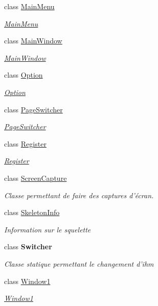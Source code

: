 \begin{DoxyCompactItemize}
class \hyperlink{class_w_p_f_page_switch_1_1_main_menu}{Main\+Menu}
\begin{DoxyCompactList}\small\item\em \hyperlink{class_w_p_f_page_switch_1_1_main_menu}{Main\+Menu} \end{DoxyCompactList}\item 
class \hyperlink{class_w_p_f_page_switch_1_1_main_window}{Main\+Window}
\begin{DoxyCompactList}\small\item\em \hyperlink{class_w_p_f_page_switch_1_1_main_window}{Main\+Window} \end{DoxyCompactList}\item 
class \hyperlink{class_w_p_f_page_switch_1_1_option}{Option}
\begin{DoxyCompactList}\small\item\em \hyperlink{class_w_p_f_page_switch_1_1_option}{Option} \end{DoxyCompactList}\item 
class \hyperlink{class_w_p_f_page_switch_1_1_page_switcher}{Page\+Switcher}
\begin{DoxyCompactList}\small\item\em \hyperlink{class_w_p_f_page_switch_1_1_page_switcher}{Page\+Switcher} \end{DoxyCompactList}\item 
class \hyperlink{class_w_p_f_page_switch_1_1_register}{Register}
\begin{DoxyCompactList}\small\item\em \hyperlink{class_w_p_f_page_switch_1_1_register}{Register} \end{DoxyCompactList}\item 
class \hyperlink{class_w_p_f_page_switch_1_1_screen_capture}{Screen\+Capture}
\begin{DoxyCompactList}\small\item\em Classe permettant de faire des captures d'écran. \end{DoxyCompactList}\item 
class \hyperlink{class_w_p_f_page_switch_1_1_skeleton_info}{Skeleton\+Info}
\begin{DoxyCompactList}\small\item\em Information sur le squelette \end{DoxyCompactList}\item 
class {\bfseries Switcher}
\begin{DoxyCompactList}\small\item\em Classe statique permettant le changement d'ihm \end{DoxyCompactList}\item 
class \hyperlink{class_w_p_f_page_switch_1_1_window1}{Window1}
\begin{DoxyCompactList}\small\item\em \hyperlink{class_w_p_f_page_switch_1_1_window1}{Window1} \end{DoxyCompactList}\end{DoxyCompactItemize}
